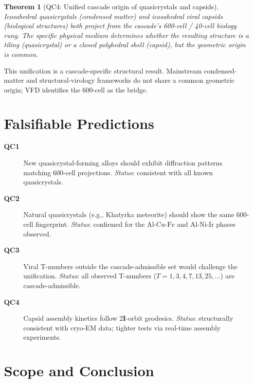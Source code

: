 \documentclass[12pt]{article}
\newtheorem{theorem}{Theorem}
\theoremstyle{remark}
\newcommand{\twoI}{2\mathbf{I}}
\begin{document}
\begin{theorem}[QC4: Unified cascade origin of quasicrystals and capsids]\label{thm:unification}
Icosahedral quasicrystals (condensed matter) and icosahedral viral capsids (biological structures) both project from the cascade's 600-cell / 40-cell biology rung. The specific physical medium determines whether the resulting structure is a tiling (quasicrystal) or a closed polyhedral shell (capsid), but the geometric origin is common.
\end{theorem}

This unification is a cascade-specific structural result. Mainstream condensed-matter and structural-virology frameworks do not share a common geometric origin; VFD identifies the 600-cell as the bridge.

\section{Falsifiable Predictions}\label{sec:predictions}

\begin{description}
\item[\textbf{QC1}] New quasicrystal-forming alloys should exhibit diffraction patterns matching 600-cell projections. \emph{Status}: consistent with all known quasicrystals.
\item[\textbf{QC2}] Natural quasicrystals (e.g., Khatyrka meteorite) should show the same 600-cell fingerprint. \emph{Status}: confirmed for the $\mathrm{Al}$-$\mathrm{Cu}$-$\mathrm{Fe}$ and $\mathrm{Al}$-$\mathrm{Ni}$-$\mathrm{Ir}$ phases observed.
\item[\textbf{QC3}] Viral T-numbers outside the cascade-admissible set would challenge the unification. \emph{Status}: all observed T-numbers ($T = 1, 3, 4, 7, 13, 25, \ldots$) are cascade-admissible.
\item[\textbf{QC4}] Capsid assembly kinetics follow $\twoI$-orbit geodesics. \emph{Status}: structurally consistent with cryo-EM data; tighter tests via real-time assembly experiments.
\end{description}

\section{Scope and Conclusion}\label{sec:scope}
\end{document}
